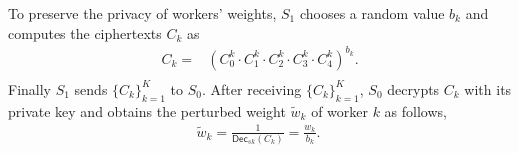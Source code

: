 \documentclass[conference]{IEEEtran}
\begin{document}

To preserve the privacy of workers' weights, $S_1$ chooses a random value $b_k$ and computes the ciphertexts $C_k$ as 
\begin{equation*}
  \begin{split}
    C_k = & \left(C_0^k\cdot C_1^k\cdot C_2^k\cdot C_3^k \cdot C_4^k\right)^{b_k} .\\
  \end{split}
\end{equation*}
Finally $S_1$ sends $\{C_k\}_{k=1}^K$ to $S_0$.
After receiving $\{C_k\}_{k=1}^K$, $S_0$ decrypts $C_k$ with its private key and obtains the perturbed weight $\tilde{w}_k$ of worker $k$ as follows,
\begin{equation}
  \begin{split}
    \tilde{w}_k = \frac{1}{\mathsf{Dec}_{sk}\left(C_k\right)} = \frac{w_k}{b_k}.
  ~\label{eq:wk}
  \end{split}
\end{equation}
\end{document}
